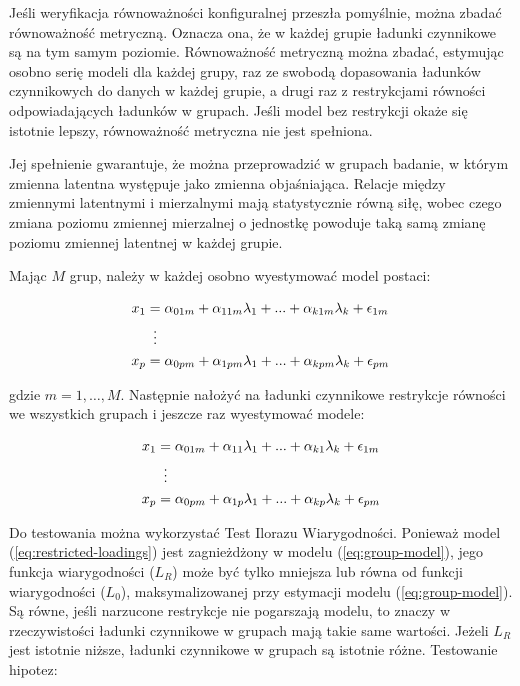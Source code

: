 \documentclass[12pt]{article}
\begin{document}
Jeśli weryfikacja równoważności konfiguralnej przeszła pomyślnie, można zbadać równoważność metryczną. Oznacza ona, że w każdej grupie ładunki czynnikowe są na tym samym poziomie. Równoważność metryczną można zbadać, estymując osobno serię modeli dla każdej grupy, raz ze swobodą dopasowania ładunków czynnikowych do danych w każdej grupie, a drugi raz z restrykcjami równości odpowiadających ładunków w grupach. Jeśli model bez restrykcji okaże się istotnie lepszy, równoważność metryczna nie jest spełniona.

Jej spełnienie gwarantuje, że można przeprowadzić w grupach badanie, w którym zmienna latentna występuje jako zmienna objaśniająca. Relacje między zmiennymi latentnymi i mierzalnymi mają statystycznie równą siłę, wobec czego zmiana poziomu zmiennej mierzalnej o jednostkę powoduje taką samą zmianę poziomu zmiennej latentnej w każdej grupie.

Mając \(M\) grup, należy w każdej osobno wyestymować model postaci:

\begin{align} 
\label{eq:group-model}
\begin{split}
x_1 &= \alpha_{01m} + \alpha_{11m} \lambda_1 + ... + \alpha_{k1m} \lambda_k + \epsilon_{1m}\\
& \vdotswithin{=} \\
x_p &= \alpha_{0pm} + \alpha_{1pm} \lambda_1 + ... + \alpha_{kpm} \lambda_k + \epsilon_{pm}\\
\end{split}
\end{align}

gdzie \(m = 1, …, M\). Następnie nałożyć na ładunki czynnikowe restrykcje równości we wszystkich grupach i jeszcze raz wyestymować modele:

\begin{align} 
\label{eq:restricted-loadings}
\begin{split}
x_1 &= \alpha_{01m} + \alpha_{11} \lambda_1 + ... + \alpha_{k1} \lambda_k + \epsilon_{1m}\\
& \vdotswithin{=} \\
x_p &= \alpha_{0pm} + \alpha_{1p} \lambda_1 + ... + \alpha_{kp} \lambda_k + \epsilon_{pm}\\
\end{split}
\end{align}

Do testowania można wykorzystać Test Ilorazu Wiarygodności. Ponieważ model (\ref{eq:restricted-loadings}) jest zagnieżdżony w modelu (\ref{eq:group-model}), jego funkcja wiarygodności (\(L_R\)) może być tylko mniejsza lub równa od funkcji wiarygodności (\(L_0\)), maksymalizowanej przy estymacji modelu (\ref{eq:group-model}). Są równe, jeśli narzucone restrykcje nie pogarszają modelu, to znaczy w rzeczywistości ładunki czynnikowe w grupach mają takie same wartości. Jeżeli \(L_R\) jest istotnie niższe, ładunki czynnikowe w grupach są istotnie różne. Testowanie hipotez:
\end{document}
